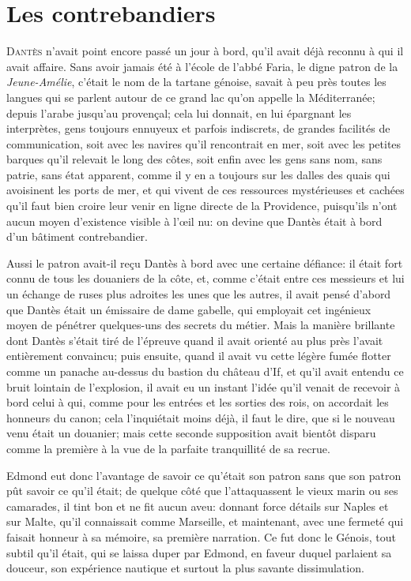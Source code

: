 \chapter{Les contrebandiers}

\lettrine{D}{antès} n'avait point encore passé un jour à bord, qu'il avait déjà reconnu à qui il avait affaire. Sans avoir jamais été à l'école de l'abbé Faria, le digne patron de la \textit{Jeune-Amélie}, c'était le nom de la tartane génoise, savait à peu près toutes les langues qui se parlent autour de ce grand lac qu'on appelle la Méditerranée; depuis l'arabe jusqu'au provençal; cela lui donnait, en lui épargnant les interprètes, gens toujours ennuyeux et parfois indiscrets, de grandes facilités de communication, soit avec les navires qu'il rencontrait en mer, soit avec les petites barques qu'il relevait le long des côtes, soit enfin avec les gens sans nom, sans patrie, sans état apparent, comme il y en a toujours sur les dalles des quais qui avoisinent les ports de mer, et qui vivent de ces ressources mystérieuses et cachées qu'il faut bien croire leur venir en ligne directe de la Providence, puisqu'ils n'ont aucun moyen d'existence visible à l'œil nu: on devine que Dantès était à bord d'un bâtiment contrebandier.

Aussi le patron avait-il reçu Dantès à bord avec une certaine défiance: il était fort connu de tous les douaniers de la côte, et, comme c'était entre ces messieurs et lui un échange de ruses plus adroites les unes que les autres, il avait pensé d'abord que Dantès était un émissaire de dame gabelle, qui employait cet ingénieux moyen de pénétrer quelques-uns des secrets du métier. Mais la manière brillante dont Dantès s'était tiré de l'épreuve quand il avait orienté au plus près l'avait entièrement convaincu; puis ensuite, quand il avait vu cette légère fumée flotter comme un panache au-dessus du bastion du château d'If, et qu'il avait entendu ce bruit lointain de l'explosion, il avait eu un instant l'idée qu'il venait de recevoir à bord celui à qui, comme pour les entrées et les sorties des rois, on accordait les honneurs du canon; cela l'inquiétait moins déjà, il faut le dire, que si le nouveau venu était un douanier; mais cette seconde supposition avait bientôt disparu comme la première à la vue de la parfaite tranquillité de sa recrue.

Edmond eut donc l'avantage de savoir ce qu'était son patron sans que son patron pût savoir ce qu'il était; de quelque côté que l'attaquassent le vieux marin ou ses camarades, il tint bon et ne fit aucun aveu: donnant force détails sur Naples et sur Malte, qu'il connaissait comme Marseille, et maintenant, avec une fermeté qui faisait honneur à sa mémoire, sa première narration. Ce fut donc le Génois, tout subtil qu'il était, qui se laissa duper par Edmond, en faveur duquel parlaient sa douceur, son expérience nautique et surtout la plus savante dissimulation.

